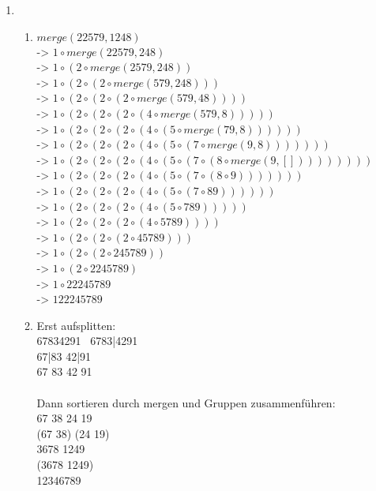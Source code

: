 \documentclass{article}
\begin{document}
\begin{enumerate}[\bfseries1.]
    \item
        \begin{enumerate}
            \item 
                $merge(22579, 1248)$ 
                \\-> $1 \circ merge(22579, 248)$
                \\-> $1 \circ (2 \circ merge(2579, 248))$ 
                \\-> $1 \circ (2 \circ (2 \circ merge(579, 248)))$ 
                \\-> $1 \circ (2 \circ (2 \circ (2 \circ merge(579, 48))))$ 
                \\-> $1 \circ (2 \circ (2 \circ (2 \circ (4 \circ 
                        merge(579, 8)))))$ 
                \\ -> $1 \circ (2 \circ (2 \circ (2 \circ 
                        (4 \circ (5 \circ merge(79, 8))))))$
                \\ -> $1 \circ (2 \circ (2 \circ (2 \circ 
                        (4 \circ (5 \circ (7 \circ merge(9, 8)))))))$
                \\ -> $1 \circ (2 \circ (2 \circ (2 \circ 
                        (4 \circ (5 \circ (7 \circ (8 \circ merge(9, []))))))))$
                \\ -> $1 \circ (2 \circ (2 \circ (2 \circ 
                        (4 \circ (5 \circ (7 \circ (8 \circ 9)))))))$
                \\ -> $1 \circ (2 \circ (2 \circ (2 \circ 
                        (4 \circ (5 \circ (7 \circ 89))))))$
                \\ -> $1 \circ (2 \circ (2 \circ (2 \circ (4 \circ (5 \circ 789)))))$
                \\ -> $1 \circ (2 \circ (2 \circ (2 \circ (4 \circ 5789))))$
                \\ -> $1 \circ (2 \circ (2 \circ (2 \circ 45789)))$
                \\ -> $1 \circ (2 \circ (2 \circ 245789))$
                \\ -> $1 \circ (2 \circ 2245789)$
                \\ -> $1 \circ 22245789$
                \\ -> $122245789$
            
            \item
                Erst aufsplitten: \\
                67834291 \
                6783|4291 \\
                67|83 42|91 \\
                67 83 42 91 \\
                \\
                Dann sortieren durch mergen und Gruppen zusammenführen:
                \\
                67 38 24 19 \\
                (67 38) (24 19) \\
                3678 1249 \\
                (3678 1249) \\
                12346789
                

\end{enumerate}
\end{enumerate}
\end{document}
